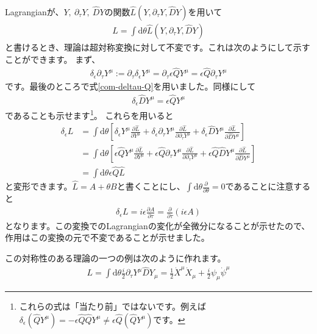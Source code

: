 \documentclass[report,paper=a4, fontsize=12pt, line_length=16cm, number_of_lines=33,dvipdfmx]{jlreq}
\numberwithin{equation}{chapter}
\numberwithin{equation}{section}
\newcommand{\del}{\partial}
\newcommand{\deldel}[2]{\frac{\del {#1}}{\del {#2}}}
\newcommand{\Qh}{\widehat{Q}}
\newcommand{\Dh}{\widehat{D}}
\newcommand{\Lh}{\widehat{L}}
\newcommand{\di}{\mathrm{d}}
\begin{document}
Lagrangianが、$Y,\ \del_{\tau}Y,\ \Dh Y$の関数$\Lh(Y,\del_{\tau}Y,\Dh Y)$を用いて
\begin{align}
L=\int \di\theta \Lh(Y,\del_{\tau}Y,\Dh Y)
\end{align}
と書けるとき、理論は超対称変換に対して不変です。これは次のようにして示すことができます。
まず、
\begin{align}
\delta_{\epsilon} \del_{\tau} Y^{\mu}:=
\del_{\tau}\delta_{\epsilon}Y^{\mu}
=\del_{\tau}\epsilon \Qh Y^{\mu}
=\epsilon \Qh \del_{\tau} Y^{\mu}
\end{align}
です。最後のところで式\eqref{com-deltau-Q}を用いました。同様にして
\begin{align}
\delta_{\epsilon} \Dh Y^{\mu}=\epsilon \Qh Y^{\mu}
\end{align}
であることも示せます\footnote{これらの式は「当たり前」ではないです。例えば$\delta_{\epsilon} (\Qh Y^{\mu})=- \epsilon \Qh \Qh Y^{\mu}
\ne\epsilon \Qh (\Qh Y^{\mu})
$です。}。
これらを用いると
\begin{align}
\delta_{\epsilon} L
&=\int \di \theta 
\left[\delta_{\epsilon} Y^{\mu}\deldel{\Lh}{Y^{\mu}}
+\delta_{\epsilon} \del_{\tau} Y^{\mu}\deldel{\Lh}{\del_{\tau} Y^{\mu}}
+\delta_{\epsilon} \Dh Y^{\mu}\deldel{\Lh}{\Dh Y^{\mu}}
\right]\nonumber\\
&=\int \di \theta 
\left[\epsilon\Qh Y^{\mu}\deldel{\Lh}{Y^{\mu}}
+\epsilon\Qh \del_{\tau} Y^{\mu}\deldel{\Lh}{\del_{\tau} Y^{\mu}}
+\epsilon\Qh \Dh Y^{\mu}\deldel{\Lh}{\Dh Y^{\mu}}
\right]\nonumber\\
&=\int \di \theta \epsilon \Qh \Lh
\end{align}
と変形できます。$\Lh=A+\theta B$と書くことにし、$\int \di \theta \deldel{}{\theta}=0$であることに注意すると
\begin{align}
\delta_{\epsilon} L=i\epsilon \deldel{A}{\tau}
=\deldel{}{\tau}(i\epsilon A)
\end{align}
となります。この変換でのLagrangianの変化が全微分になることが示せたので、作用はこの変換の元で不変であることが示せました。

この対称性のある理論の一つの例は次のように作れます。
\begin{align}
L=\int \di \theta \frac{i}{2}\del_{\tau} Y^{\mu} \Dh Y_{\mu}
=\frac12 \dot{X}^{\mu}\dot{X}_{\mu} +\frac i2 \psi_{\mu}\dot{\psi}^{\mu} 
\label{susyQM0}
\end{align}
\end{document}
